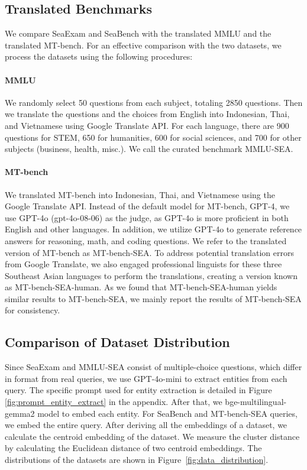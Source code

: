 




\subsection{Translated Benchmarks}
We compare SeaExam and SeaBench with the translated MMLU and the translated MT-bench. For an effective comparison with the two datasets, we process the datasets using the following procedures:
\paragraph{MMLU} We randomly select 50 questions from each subject, totaling 2850 questions. Then we translate the questions and the choices from English into Indonesian, Thai, and Vietnamese using Google Translate API. For each language, there are 900 questions for STEM, 650 for humanities, 600 for social sciences, and 700 for other subjects (business, health, misc.). We call the curated benchmark MMLU-SEA. 

\paragraph{MT-bench} We translated MT-bench into Indonesian, Thai, and Vietnamese using the Google Translate API. Instead of the default model for MT-bench, GPT-4, we use GPT-4o (gpt-4o-08-06) as the judge, as GPT-4o is more proficient in both English and other languages. In addition, we utilize GPT-4o to generate reference answers for reasoning, math, and coding questions. We refer to the translated version of MT-bench as MT-bench-SEA. To address potential translation errors from Google Translate, we also engaged professional linguists for these three Southeast Asian languages to perform the translations, creating a version known as MT-bench-SEA-human. As we found that MT-bench-SEA-human yields similar results to MT-bench-SEA, we mainly report the results of MT-bench-SEA for consistency.

\subsection{Comparison of Dataset Distribution}

Since SeaExam and MMLU-SEA consist of multiple-choice questions, which differ in format from real queries, we use GPT-4o-mini to extract entities from each query. The specific prompt used for entity extraction is detailed in Figure \ref{fig:prompt_entity_extract} in the appendix. After that, we bge-multilingual-gemma2 model to embed each entity. For SeaBench and MT-bench-SEA queries, we embed the entire query. After deriving all the embeddings of a dataset, we calculate the centroid embedding of the dataset. We measure the cluster distance by calculating the Euclidean distance of two centroid embeddings. The distributions of the datasets are shown in Figure~\ref{fig:data_distribution}.



